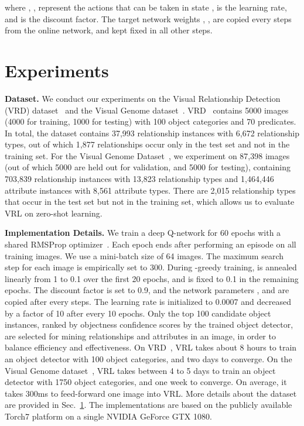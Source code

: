 \documentclass[10pt,twocolumn,letterpaper]{article}
\begin{document}
where , ,  represent the actions that can be taken in state ,  is the learning {rate,} and  is the discount factor. The target network weights {, ,  are copied every  steps from the online network, and kept fixed in all other steps.}


\section{Experiments}
\label{sec:exp}
\textbf{Dataset.} We conduct our experiments on the Visual Relationship Detection (VRD) dataset~\cite{lu2016visual} and the Visual Genome dataset~\cite{krishna2016visual}. VRD~\cite{lu2016visual} contains 5000 images (4000 for training, 1000 for testing) with 100 object categories and 70 predicates. In total, the dataset contains 37,993 relationship instances with 6,672 relationship types, out of which 1,877 relationships occur only in the test set and not in the training set. For the Visual Genome Dataset~\cite{krishna2016visual}, we experiment on 87,398 images (out of which 5000 are held out for validation, and 5000 for testing), containing 703,839 relationship instances with 13,823 relationship types and 1,464,446 attribute instances with 8,561 attribute types. There are 2,015 relationship types that occur in the test set but not in the training set, which allows us to evaluate VRL on zero-shot learning.


\textbf{Implementation Details.} We train a deep Q-network for 60 epochs with a shared RMSProp optimizer~\cite{tieleman2012lecture}. Each epoch ends after performing an episode on all training {images}. We use a mini-batch size of 64 images. The { maximum} search step for each {image} is empirically set {to} 300. During -greedy training,  is annealed linearly from 1 to 0.1 over the first 20 epochs, and is fixed to 0.1 in the remaining epochs. The discount factor  is set to 0.9, and the network parameters ,  and  are copied after every  steps. The learning rate  is initialized to 0.0007 and decreased by a factor of 10 after every 10 epochs. {Only} the top 100 candidate object instances, {ranked by objectness confidence scores by the trained object detector}, are selected for mining relationships and attributes in an image, in order to {balance} efficiency and effectiveness. On VRD~\cite{lu2016visual}, VRL takes about 8 hours to train an object detector with 100 object categories, and two days to converge. On the Visual Genome dataset~\cite{krishna2016visual}, VRL takes between 4 to 5 days to train an object detector with 1750 object categories, and one week to converge. On average, it takes 300ms to feed-forward one image into VRL. More details about the dataset are provided in Sec.~\ref{sec:exp}. The implementations are based on the publicly available Torch7 platform on a single NVIDIA GeForce GTX 1080.
\end{document}
